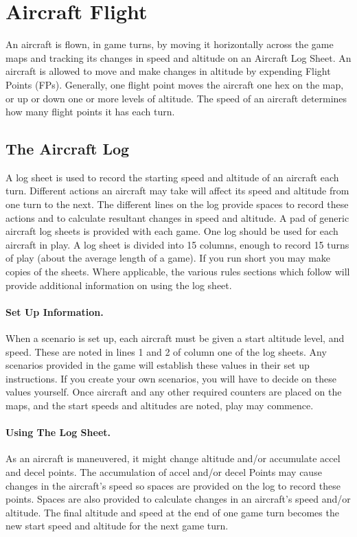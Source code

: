 \section{Aircraft Flight}

An aircraft is flown, in game turns, by moving it horizontally across the game maps and tracking its changes in speed and altitude on an Aircraft Log Sheet. An aircraft is allowed to move and make changes in altitude by expending Flight Points (FPs). Generally, one flight point moves the aircraft one hex on the map, or up or down one or more levels of altitude. The speed of an aircraft determines how many flight points it has each turn.

\subsection{The Aircraft Log}

A log sheet is used to record the starting speed and altitude of an aircraft each turn. Different actions an aircraft may take will affect its speed and altitude from one turn to the next. The different lines on the log provide spaces to record these actions and to calculate resultant changes in speed and altitude. A pad of generic aircraft log sheets is provided with each game. One log should be used for each aircraft in play. A log sheet is divided into 15 columns, enough to record 15 turns of play (about the average length of a game). If you run short you may make copies of the sheets. Where applicable, the various rules sections which follow will provide additional information on using the log sheet.

\paragraph{Set Up Information.} When a scenario is set up, each aircraft must be given a start altitude level, and speed. These are noted in lines 1 and 2 of column one of the log sheets. Any scenarios provided in the game will establish these values in their set up instructions. If you create your own scenarios, you will have to decide on these values yourself. Once aircraft and any other required counters are placed on the maps, and the start speeds and altitudes are noted, play may commence.

\paragraph{Using The Log Sheet.} As an aircraft is maneuvered, it might change altitude and/or accumulate accel and decel points. The accumulation of accel and/or decel Points may cause changes in the aircraft's speed so spaces are provided on the log to record these points. Spaces are also provided to calculate changes in an aircraft's speed and/or altitude. The final altitude and speed at the end of one game turn becomes the new start speed and altitude for the next game turn.

